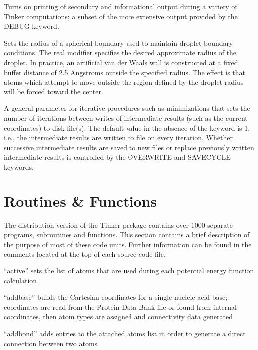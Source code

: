 \documentclass[letterpaper,11pt,english]{sphinxmanual}
\begin{document}
  Turns on printing of secondary and informational output during a variety of Tinker computations; a subset of the more extensive output provided by the DEBUG keyword.

  Sets the radius of a spherical boundary used to maintain droplet boundary conditions. The real modifier specifies the desired approximate radius of the droplet. In practice, an artificial van der Waals wall is constructed at a fixed buffer distance of 2.5 Angstroms outside the specified radius. The effect is that atoms which attempt to move outside the region defined by the droplet radius will be forced toward the center.

  A general parameter for iterative procedures such as minimizations that sets the number of iterations between writes of intermediate results (such as the current coordinates) to disk file(s). The default value in the absence of the keyword is 1, i.e., the intermediate results are written to file on every iteration. Whether successive intermediate results are saved to new files or replace previously written intermediate results is controlled by the OVERWRITE and SAVE\sphinxhyphen{}CYCLE keywords.


\chapter{Routines \& Functions}
\label{\detokenize{text/routines:routines-functions}}\label{\detokenize{text/routines::doc}}
The distribution version of the Tinker package contains over 1000 separate programs, subroutines and functions. This section contains a brief description of the purpose of most of these code units. Further information can be found in the comments located at the top of each source code file.


“active” sets the list of atoms that are used during
each potential energy function calculation


“addbase” builds the Cartesian coordinates for a single nucleic
acid base; coordinates are read from the Protein Data Bank file
or found from internal coordinates, then atom types are assigned
and connectivity data generated


“addbond” adds entries to the attached atoms list in
order to generate a direct connection between two atoms
\end{document}
